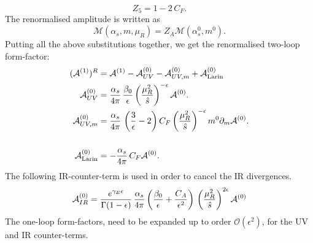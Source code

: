 \begin{equation}
	Z_5 = 1- 2\, C_F.
\end{equation}
The renormalised amplitude is written as
\begin{equation}
	\mathcal M  (\alpha_s, m, \mu_R) = Z_A \mathcal M( \alpha_s^0, m^0).
\end{equation}
Putting all the above substitutions together, we get the renormalised  two-loop form-factor:
\begin{align}
	( \mathcal A ^{(1)})^R &= 	\mathcal A ^{(1)} -	\mathcal A_{UV} ^{(0)}- 	\mathcal A_{UV, m} ^{(0)} + \mathcal A_{\text{Larin}} ^{(0)}   \\
	\mathcal A_{UV} ^{(0)} &= \frac{\alpha_s}{4 \pi}\,\frac{\beta_0}{\epsilon} \left( \frac{\mu_R^2}{\hat s} \right) ^{ -\epsilon} 	\mathcal A ^{(0)}.  \nonumber \\
	\mathcal A_{UV, m} ^{(0)} &= \frac{\alpha_s}{4 \pi} \, \left( \frac{3}{\epsilon} -2\right) C_F \left( \frac{\mu_R^2}{\hat s} \right) ^{ -\epsilon} m^0 \partial_m \mathcal A^{(0)} . \nonumber \\
	\\
	\mathcal	A_{\text{Larin}} ^{(0)}  &= - \frac{\alpha_s}{4 \pi} \, C_F  \mathcal A ^{(0)} .\nonumber
\end{align}
The following IR-counter-term is used in order to cancel the IR divergences.
\begin{equation}
	\mathcal A_{IR} ^{(0)}  = \frac{e^{\gamma_E \epsilon}}{\Gamma(1-\epsilon)} \, \frac{\alpha_s}{4 \pi} \left( \frac{\beta_0}{\epsilon} + \frac{ C_A}{\epsilon^2} \right)  \, \left(  \frac{\mu_R^2}{\hat s}\right) ^{2\epsilon} \mathcal A ^{(0)}
\end{equation}
The one-loop form-factors, need to be expanded up to order $ \mathcal O(\epsilon^2) $, for the UV and IR counter-terms.
